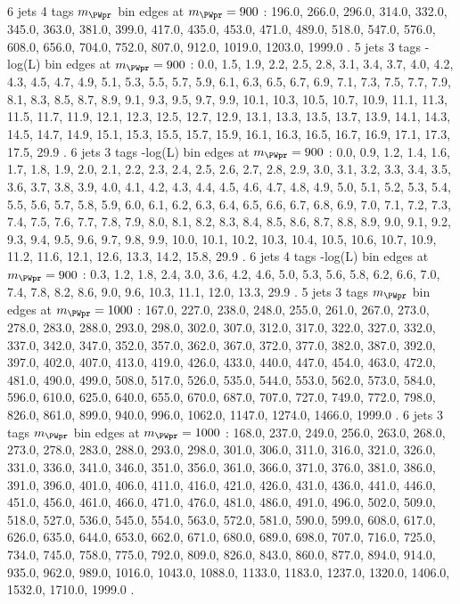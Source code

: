 6 jets 4 \Pqb tags $m_{\PWpr}$ bin edges at $m_{\PWpr}=900$ \GeV:
196.0, 266.0, 296.0, 314.0, 332.0, 345.0, 363.0, 381.0, 399.0, 417.0, 435.0, 453.0, 471.0, 489.0, 518.0, 547.0, 576.0, 608.0, 656.0, 704.0, 752.0, 807.0, 912.0, 1019.0, 1203.0, 1999.0 .
5 jets 3 \Pqb tags -log(L) bin edges at $m_{\PWpr}=900$ \GeV:
0.0, 1.5, 1.9, 2.2, 2.5, 2.8, 3.1, 3.4, 3.7, 4.0, 4.2, 4.3, 4.5, 4.7, 4.9, 5.1, 5.3, 5.5, 5.7, 5.9, 6.1, 6.3, 6.5, 6.7, 6.9, 7.1, 7.3, 7.5, 7.7, 7.9, 8.1, 8.3, 8.5, 8.7, 8.9, 9.1, 9.3, 9.5, 9.7, 9.9, 10.1, 10.3, 10.5, 10.7, 10.9, 11.1, 11.3, 11.5, 11.7, 11.9, 12.1, 12.3, 12.5, 12.7, 12.9, 13.1, 13.3, 13.5, 13.7, 13.9, 14.1, 14.3, 14.5, 14.7, 14.9, 15.1, 15.3, 15.5, 15.7, 15.9, 16.1, 16.3, 16.5, 16.7, 16.9, 17.1, 17.3, 17.5, 29.9 .
6 jets 3 \Pqb tags -log(L) bin edges at $m_{\PWpr}=900$ \GeV:
0.0, 0.9, 1.2, 1.4, 1.6, 1.7, 1.8, 1.9, 2.0, 2.1, 2.2, 2.3, 2.4, 2.5, 2.6, 2.7, 2.8, 2.9, 3.0, 3.1, 3.2, 3.3, 3.4, 3.5, 3.6, 3.7, 3.8, 3.9, 4.0, 4.1, 4.2, 4.3, 4.4, 4.5, 4.6, 4.7, 4.8, 4.9, 5.0, 5.1, 5.2, 5.3, 5.4, 5.5, 5.6, 5.7, 5.8, 5.9, 6.0, 6.1, 6.2, 6.3, 6.4, 6.5, 6.6, 6.7, 6.8, 6.9, 7.0, 7.1, 7.2, 7.3, 7.4, 7.5, 7.6, 7.7, 7.8, 7.9, 8.0, 8.1, 8.2, 8.3, 8.4, 8.5, 8.6, 8.7, 8.8, 8.9, 9.0, 9.1, 9.2, 9.3, 9.4, 9.5, 9.6, 9.7, 9.8, 9.9, 10.0, 10.1, 10.2, 10.3, 10.4, 10.5, 10.6, 10.7, 10.9, 11.2, 11.6, 12.1, 12.6, 13.3, 14.2, 15.8, 29.9 .
6 jets 4 \Pqb tags -log(L) bin edges at $m_{\PWpr}=900$ \GeV:
0.3, 1.2, 1.8, 2.4, 3.0, 3.6, 4.2, 4.6, 5.0, 5.3, 5.6, 5.8, 6.2, 6.6, 7.0, 7.4, 7.8, 8.2, 8.6, 9.0, 9.6, 10.3, 11.1, 12.0, 13.3, 29.9 .
5 jets 3 \Pqb tags $m_{\PWpr}$ bin edges at $m_{\PWpr}=1000$ \GeV:
167.0, 227.0, 238.0, 248.0, 255.0, 261.0, 267.0, 273.0, 278.0, 283.0, 288.0, 293.0, 298.0, 302.0, 307.0, 312.0, 317.0, 322.0, 327.0, 332.0, 337.0, 342.0, 347.0, 352.0, 357.0, 362.0, 367.0, 372.0, 377.0, 382.0, 387.0, 392.0, 397.0, 402.0, 407.0, 413.0, 419.0, 426.0, 433.0, 440.0, 447.0, 454.0, 463.0, 472.0, 481.0, 490.0, 499.0, 508.0, 517.0, 526.0, 535.0, 544.0, 553.0, 562.0, 573.0, 584.0, 596.0, 610.0, 625.0, 640.0, 655.0, 670.0, 687.0, 707.0, 727.0, 749.0, 772.0, 798.0, 826.0, 861.0, 899.0, 940.0, 996.0, 1062.0, 1147.0, 1274.0, 1466.0, 1999.0 .
6 jets 3 \Pqb tags $m_{\PWpr}$ bin edges at $m_{\PWpr}=1000$ \GeV:
168.0, 237.0, 249.0, 256.0, 263.0, 268.0, 273.0, 278.0, 283.0, 288.0, 293.0, 298.0, 301.0, 306.0, 311.0, 316.0, 321.0, 326.0, 331.0, 336.0, 341.0, 346.0, 351.0, 356.0, 361.0, 366.0, 371.0, 376.0, 381.0, 386.0, 391.0, 396.0, 401.0, 406.0, 411.0, 416.0, 421.0, 426.0, 431.0, 436.0, 441.0, 446.0, 451.0, 456.0, 461.0, 466.0, 471.0, 476.0, 481.0, 486.0, 491.0, 496.0, 502.0, 509.0, 518.0, 527.0, 536.0, 545.0, 554.0, 563.0, 572.0, 581.0, 590.0, 599.0, 608.0, 617.0, 626.0, 635.0, 644.0, 653.0, 662.0, 671.0, 680.0, 689.0, 698.0, 707.0, 716.0, 725.0, 734.0, 745.0, 758.0, 775.0, 792.0, 809.0, 826.0, 843.0, 860.0, 877.0, 894.0, 914.0, 935.0, 962.0, 989.0, 1016.0, 1043.0, 1088.0, 1133.0, 1183.0, 1237.0, 1320.0, 1406.0, 1532.0, 1710.0, 1999.0 .
